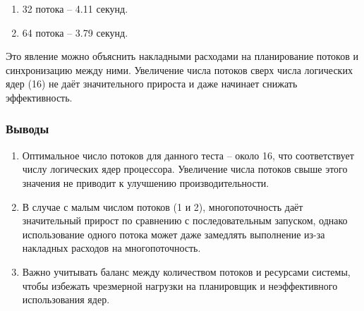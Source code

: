 \begin{enumerate}
    \item 32 потока – 4.11 секунд.
    \item 64 потока – 3.79 секунд.
\end{enumerate}

Это явление можно объяснить накладными расходами на планирование потоков и синхронизацию между ними. Увеличение числа потоков сверх числа логических ядер (16) не даёт значительного прироста и даже начинает снижать эффективность.

\subsubsection*{Выводы}

\begin{enumerate}
    \item Оптимальное число потоков для данного теста – около 16, что соответствует числу логических ядер процессора. Увеличение числа потоков свыше этого значения не приводит к улучшению производительности.
    \item В случае с малым числом потоков (1 и 2), многопоточность даёт значительный прирост по сравнению с последовательным запуском, однако использование одного потока может даже замедлять выполнение из-за накладных расходов на многопоточность.
    \item Важно учитывать баланс между количеством потоков и ресурсами системы, чтобы избежать чрезмерной нагрузки на планировщик и неэффективного использования ядер.
\end{enumerate}